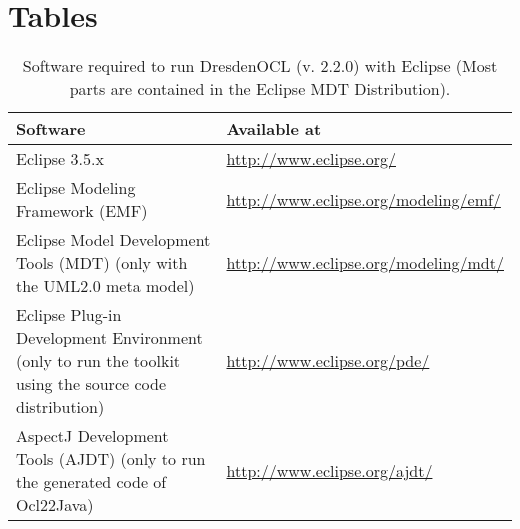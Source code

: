 \cleardoublepage
{}
{}
\chapter*{Tables}

\begin{table}[h]
\begin{tabular}{|p{7cm}|p{7cm}|}
    \hline
    \textbf{Software} & \textbf{Available at} \\
    \hline
    Eclipse 3.5.x & \url{http://www.eclipse.org/} \\
    \hline
    Eclipse Modeling Framework (EMF) & \url{http://www.eclipse.org/modeling/emf/} \\
    \hline
    Eclipse Model Development Tools (MDT) (only with the UML2.0 meta model) & \url{http://www.eclipse.org/modeling/mdt/} \\
    \hline
    Eclipse Plug-in Development Environment (only to run the toolkit using the source code distribution) & \url{http://www.eclipse.org/pde/} \\
    \hline
    AspectJ Development Tools (AJDT) (only to run the generated code of Ocl22Java) & \url{http://www.eclipse.org/ajdt/} \\
    \hline
\end{tabular}
\caption{Software required to run DresdenOCL (v. 2.2.0) with Eclipse \newline(Most parts are con\-tained in the Eclipse MDT Distribution).}
\label{tab:software}
\end{table}



